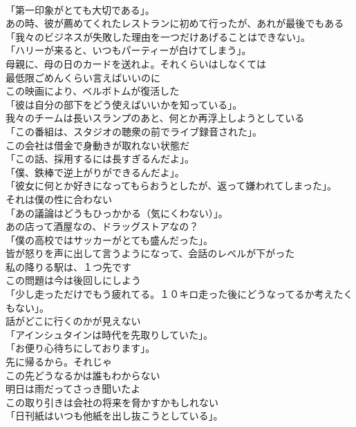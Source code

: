 \documentclass[8pt]{extreport}
\begin{document}
\begin{CJK}{UTF8}{min}
\\	「第一印象がとても大切である」。	
\\	あの時、彼が薦めてくれたレストランに初めて行ったが、あれが最後でもある	
\\	「我々のビジネスが失敗した理由を一つだけあげることはできない」。	
\\	「ハリーが来ると、いつもパーティーが白けてしまう」。	
\\	母親に、母の日のカードを送れよ。それくらいはしなくては	
\\	最低限ごめんくらい言えばいいのに	
\\	この映画により、ベルボトムが復活した	
\\	「彼は自分の部下をどう使えばいいかを知っている」。	
\\	我々のチームは長いスランプのあと、何とか再浮上しようとしている	
\\	「この番組は、スタジオの聴衆の前でライブ録音された」。	
\\	この会社は借金で身動きが取れない状態だ	
\\	「この話、採用するには長すぎるんだよ」。	
\\	「僕、鉄棒で逆上がりができるんだよ」。	
\\	「彼女に何とか好きになってもらおうとしたが、返って嫌われてしまった」。	
\\	それは僕の性に合わない	
\\	「あの議論はどうもひっかかる（気にくわない）」。	
\\	あの店って酒屋なの、ドラッグストアなの？	
\\	「僕の高校ではサッカーがとても盛んだった」。	
\\	皆が怒りを声に出して言うようになって、会話のレベルが下がった	
\\	私の降りる駅は、１つ先です	
\\	この問題は今は後回しにしよう	
\\	「少し走っただけでもう疲れてる。１０キロ走った後にどうなってるか考えたくもない」。	
\\	話がどこに行くのかが見えない	
\\	「アインシュタインは時代を先取りしていた」。	
\\	「お便り心待ちにしております」。	
\\	先に帰るから。それじゃ	
\\	この先どうなるかは誰もわからない	
\\	明日は雨だってさっき聞いたよ	
\\	この取り引きは会社の将来を脅かすかもしれない	
\\	「日刊紙はいつも他紙を出し抜こうとしている」。	

\end{CJK}
\end{document}
